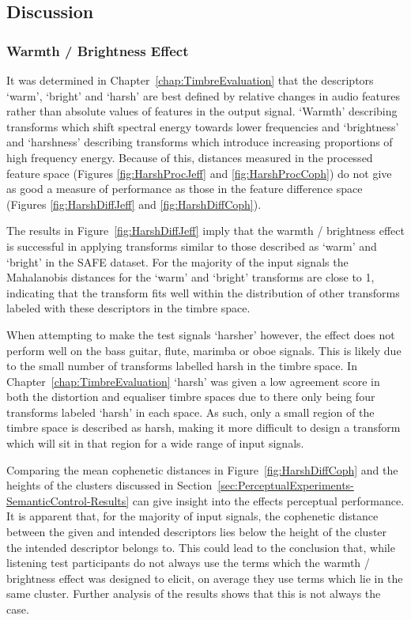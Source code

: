 	\subsection{Discussion}
	\label{sec:PerceptualExperiments-SemanticControl-Discussion}
		\subsubsection*{Warmth / Brightness Effect}
			It was determined in Chapter~\ref{chap:TimbreEvaluation} that the descriptors `warm', `bright' and
			`harsh' are best defined by relative changes in audio features rather than absolute values of
			features in the output signal. `Warmth' describing transforms which shift spectral energy towards
			lower frequencies and `brightness' and `harshness' describing transforms which introduce increasing
			proportions of high frequency energy. Because of this, distances measured in the processed feature
			space (Figures \ref{fig:HarshProcJeff} and \ref{fig:HarshProcCoph}) do not give as good a measure
			of performance as those in the feature difference space (Figures \ref{fig:HarshDiffJeff} and
			\ref{fig:HarshDiffCoph}).

			The results in Figure~\ref{fig:HarshDiffJeff} imply that the warmth / brightness effect is
			successful in applying transforms similar to those described as `warm' and `bright' in the SAFE
			dataset. For the majority of the input signals the Mahalanobis distances for the `warm' and
			`bright' transforms are close to 1, indicating that the transform fits well within the distribution
			of other transforms labeled with these descriptors in the timbre space.
			
			When attempting to make the test signals `harsher' however, the effect does not perform well on the
			bass guitar, flute, marimba or oboe signals. This is likely due to the small number of transforms
			labelled harsh in the timbre space. In Chapter~\ref{chap:TimbreEvaluation} `harsh' was given a low
			agreement score in both the distortion and equaliser timbre spaces due to there only being four
			transforms labeled `harsh' in each space. As such, only a small region of the timbre space is
			described as harsh, making it more difficult to design a transform which will sit in that region
			for a wide range of input signals.
			
			Comparing the mean cophenetic distances in Figure~\ref{fig:HarshDiffCoph} and the heights of the
			clusters discussed in Section~\ref{sec:PerceptualExperiments-SemanticControl-Results} can give
			insight into the effects perceptual performance. It is apparent that, for the majority of input
			signals, the cophenetic distance between the given and intended descriptors lies below the height
			of the cluster the intended descriptor belongs to. This could lead to the conclusion that, while
			listening test participants do not always use the terms which the warmth / brightness effect was
			designed to elicit, on average they use terms which lie in the same cluster. Further analysis of
			the results shows that this is not always the case. 

